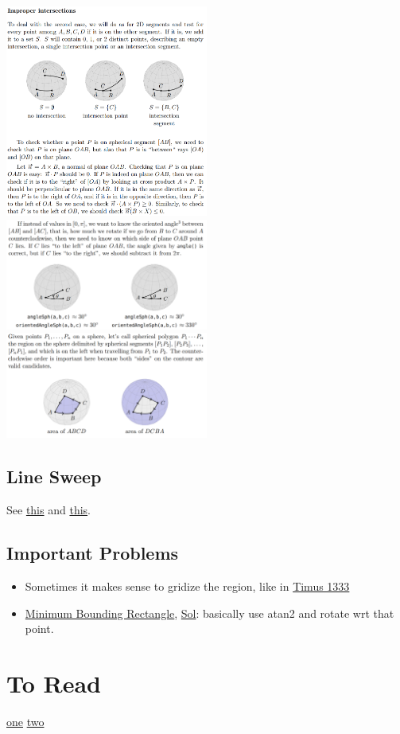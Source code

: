 \documentclass[8pt, a4paper, oneside, twocolumn]{extarticle}
\begin{document}
\\\includegraphics[width=0.5\textwidth,height=0.5\textheight,keepaspectratio]{segsegcir3}
\\\includegraphics[width=0.5\textwidth,height=0.5\textheight,keepaspectratio]{orientedangle}
\\\includegraphics[width=0.5\textwidth,height=0.5\textheight,keepaspectratio]{spherearea}
\subsection{Line Sweep}
See \href{https://www.topcoder.com/community/competitive-programming/tutorials/line-sweep-algorithms/}{this} and \href{https://github.com/sourabh2311/Competitive-Programming/blob/master/RevisionNotes/linesweep.pdf}{this}.
\subsection{Important Problems}
\begin{itemize}
    \item Sometimes it makes sense to gridize the region, like in \href{https://github.com/sourabh2311/Competitive-Programming/blob/master/timus/1333.cpp}{Timus 1333}
    \item \href{https://uva.onlinejudge.org/external/101/10173.pdf}{Minimum Bounding Rectangle}, \href{https://github.com/sourabh2311/Competitive-Programming/blob/master/UVA_10173.cpp}{Sol}: basically use atan2 and rotate wrt that point.
\end{itemize}
\section{To Read}
\href{https://codeforces.com/blog/entry/64829}{one}
\href{https://codeforces.com/blog/entry/64783}{two}
\end{document}
